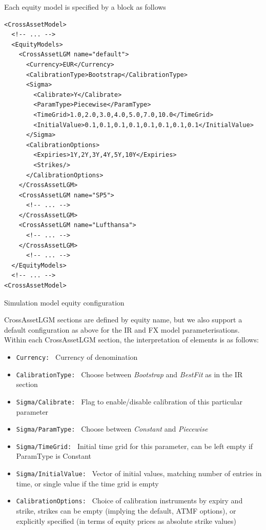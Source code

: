 \documentclass[12pt, a4paper]{article}
\begin{document}
{{\medskip

Each equity model is specified by a block as follows

\begin{listing}[H]
\begin{verbatim}
<CrossAssetModel>	
  <!-- ... -->
  <EquityModels>
    <CrossAssetLGM name="default">
      <Currency>EUR</Currency>
      <CalibrationType>Bootstrap</CalibrationType>
      <Sigma>
        <Calibrate>Y</Calibrate>
        <ParamType>Piecewise</ParamType>
        <TimeGrid>1.0,2.0,3.0,4.0,5.0,7.0,10.0</TimeGrid>
        <InitialValue>0.1,0.1,0.1,0.1,0.1,0.1,0.1,0.1</InitialValue>
      </Sigma>
      <CalibrationOptions>
        <Expiries>1Y,2Y,3Y,4Y,5Y,10Y</Expiries>
        <Strikes/>
      </CalibrationOptions>
    </CrossAssetLGM>
    <CrossAssetLGM name="SP5">
      <!-- ... -->
    </CrossAssetLGM>
    <CrossAssetLGM name="Lufthansa">
      <!-- ... -->
    </CrossAssetLGM>
      <!-- ... -->
  </EquityModels>
  <!-- ... -->
<CrossAssetModel>	
\end{verbatim}
\caption{Simulation model equity configuration}
\label{lst:simulation_model_eq_configuration}
\end{listing}

CrossAssetLGM sections are defined by equity name, but we also support a default configuration as above for the IR and 
FX model parameterisations.  Within each CrossAssetLGM section, the interpretation of elements is as follows:

\begin{itemize}
	\item {\tt Currency: } Currency of denomination
	\item {\tt CalibrationType: } Choose between {\em Bootstrap} and {\em BestFit} as in the IR section
	\item {\tt Sigma/Calibrate: } Flag to enable/disable calibration of this particular parameter
	\item {\tt Sigma/ParamType: } Choose between {\em Constant} and {\em Piecewise}
	\item {\tt Sigma/TimeGrid: } Initial time grid for this parameter, can be left empty if ParamType is Constant
	\item {\tt Sigma/InitialValue: } Vector of initial values, matching number of entries in time, or single value if 
	the time grid is empty
	\item {\tt CalibrationOptions: } Choice of calibration instruments by expiry and strike, strikes can be empty 
	(implying the default, ATMF options), or explicitly specified (in terms of equity prices as absolute strike values)
\end{itemize}

}}
\end{document}
